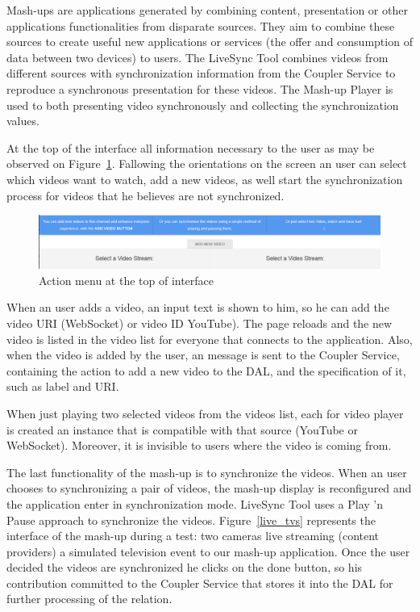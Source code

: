 
Mash-ups are applications generated by combining content, presentation or other applications functionalities from disparate sources. They aim to combine these sources to create useful new applications or services (the offer and consumption of data between two devices) to users. The LiveSync Tool combines videos from different sources with synchronization information from the Coupler Service to reproduce a synchronous presentation for these videos. The Mash-up Player is used to both presenting video synchronously and collecting the synchronization values. 

At the top of the interface all information necessary to the user as may be observed on Figure~\ref{menu_add_view}. Fallowing the orientations on the screen an user can select which videos want to watch, add a new videos, as well start the synchronization process for videos that he believes are not synchronized. 

\begin{figure}[h]
	\centerline{\includegraphics[scale=0.3] {figures/menu_add_view}}
	\caption{Action menu at the top of interface}
	\label{menu_add_view}
\end{figure}

When an user adds a video, an input text is shown to him, so he can add the video URI (WebSocket) or video ID YouTube). The page reloads and the new video is listed in the video list for everyone that connects to the application. Also, when the video is added by the user, an message is sent to the Coupler Service, containing the action to add a new video to the DAL, and the specification of it, such as label and URI.

When just playing two selected videos from the videos list, each for video player is created an instance that is compatible with that source (YouTube or WebSocket). Moreover, it is invisible to users where the video is coming from.

The last functionality of the mash-up is to synchronize the videos. When an user chooses to synchronizing a pair of videos, the mash-up display is reconfigured and the application enter in synchronization mode. LiveSync Tool uses a Play ’n Pause approach to synchronize the videos. Figure~\ref{live_tvs} represents the interface of the mash-up during a test: two cameras live streaming (content providers) a simulated television event to our mash-up application. Once the user decided the videos are synchronized he clicks on the done button, so his contribution committed to the Coupler Service that stores it into the DAL for further processing of the relation.

